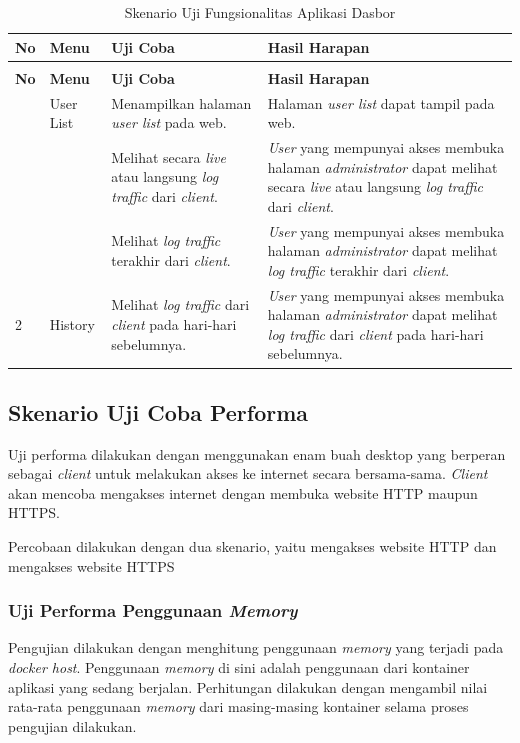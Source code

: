 \begin{longtable}{|p{}|p{}|p{}|p{}|}
	\caption{Skenario Uji Fungsionalitas Aplikasi Halaman \textit{Administrator}} \label{ujicoba5} \\
	\hline
	\textbf{No} & \textbf{Menu} & \textbf{Uji Coba} & \textbf{Hasil Harapan} \\ \hline
	\endfirsthead
	\caption[]{Skenario Uji Fungsionalitas Aplikasi Dasbor}  \\
	\hline
	\textbf{No} & \textbf{Menu} & \textbf{Uji Coba} & \textbf{Hasil Harapan} \\ \hline
	\endhead
	\endfoot
	\endlastfoot
	1 & User List & Menampilkan halaman \textit{user list} pada web. & Halaman \textit{user list} dapat tampil pada web. \\ \cline{3-4}
	&& Melihat secara \textit{live} atau langsung \textit{log traffic} dari \textit{client}. & \textit{User} yang mempunyai akses membuka halaman \textit{administrator} dapat melihat secara \textit{live} atau langsung \textit{log traffic} dari \textit{client}. \\ \cline{3-4}
	&& Melihat \textit{log traffic} terakhir dari \textit{client}. & \textit{User} yang mempunyai akses membuka halaman \textit{administrator} dapat melihat \textit{log traffic} terakhir dari \textit{client}. \\ \hline
	2 & History & Melihat \textit{log traffic} dari \textit{client} pada hari-hari sebelumnya.  & \textit{User} yang mempunyai akses membuka halaman \textit{administrator} dapat melihat \textit{log traffic} dari \textit{client} pada hari-hari sebelumnya. \\ \hline
\end{longtable}

\subsection{Skenario Uji Coba Performa}
Uji performa dilakukan dengan menggunakan enam buah desktop yang berperan sebagai \textit{client} untuk melakukan akses ke internet secara bersama-sama. \textit{Client} akan mencoba mengakses internet dengan membuka website HTTP maupun HTTPS.

Percobaan dilakukan dengan dua skenario, yaitu mengakses website HTTP dan mengakses website HTTPS

\subsubsection{Uji Performa Penggunaan \textit{Memory}}
Pengujian dilakukan dengan menghitung penggunaan \textit{memory} yang terjadi pada \textit{docker host}. Penggunaan \textit{memory} di sini adalah penggunaan dari kontainer aplikasi yang sedang berjalan. Perhitungan dilakukan dengan mengambil nilai rata-rata penggunaan \textit{memory} dari masing-masing kontainer selama proses pengujian dilakukan.

